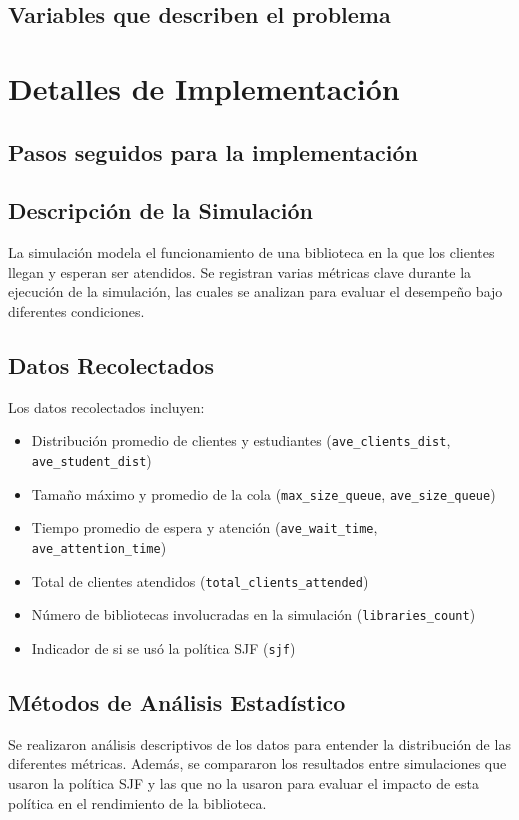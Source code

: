 \documentclass[10pt,twocolumn]{article}
\begin{document}
	\subsection{Variables que describen el problema}
	
	\section{Detalles de Implementación}
	
	\subsection{Pasos seguidos para la implementación}
	
	\subsection{Descripción de la Simulación}
	La simulación modela el funcionamiento de una biblioteca en la que los clientes llegan y esperan ser atendidos. Se registran varias métricas clave durante la ejecución de la simulación, las cuales se analizan para evaluar el desempeño bajo diferentes condiciones.
	
	\subsection{Datos Recolectados}
	Los datos recolectados incluyen:
	\begin{itemize}
		\item Distribución promedio de clientes y estudiantes (\texttt{ave\_clients\_dist}, \texttt{ave\_student\_dist})
		\item Tamaño máximo y promedio de la cola (\texttt{max\_size\_queue}, \texttt{ave\_size\_queue})
		\item Tiempo promedio de espera y atención (\texttt{ave\_wait\_time}, \texttt{ave\_attention\_time})
		\item Total de clientes atendidos (\texttt{total\_clients\_attended})
		\item Número de bibliotecas involucradas en la simulación (\texttt{libraries\_count})
		\item Indicador de si se usó la política SJF (\texttt{sjf})
	\end{itemize}
	
	\subsection{Métodos de Análisis Estadístico}
	Se realizaron análisis descriptivos de los datos para entender la distribución de las diferentes métricas. Además, se compararon los resultados entre simulaciones que usaron la política SJF y las que no la usaron para evaluar el impacto de esta política en el rendimiento de la biblioteca.
	
\end{document}

